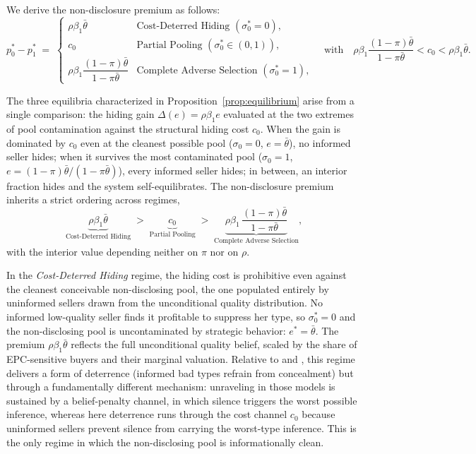 \documentclass[10pt,letterpaper]{bp-template-concise}
\begin{document}
We derive the non-disclosure premium as follows:
\begin{equation}
    p_0^*-p_1^* \;=\;
    \begin{cases}
        \rho\beta_1\bar{\theta}
            & \text{Cost-Deterred Hiding }(\sigma_0^*=0), \\[4pt]
        c_0
            & \text{Partial Pooling }(\sigma_0^*\in(0,1)), \\[4pt]
        \rho\beta_1\dfrac{(1-\pi)\bar{\theta}}{1-\pi\bar{\theta}}
            & \text{Complete Adverse Selection }(\sigma_0^*=1),
    \end{cases}
    \quad \text{with}\quad \rho\beta_1\frac{(1-\pi)\bar{\theta}}{1-\pi\bar{\theta}} < c_0 < \rho\beta_1\bar{\theta}.
    \label{eq:premium}
\end{equation}

The three equilibria characterized in Proposition~\ref{prop:equilibrium} arise from a single comparison: the hiding gain $\Delta(e)=\rho\beta_1 e$ evaluated at the two extremes of pool contamination against the structural hiding cost $c_0$. When the gain is dominated by $c_0$ even at the cleanest possible pool ($\sigma_0=0$, $e=\bar{\theta}$), no informed seller hides; when it survives the most contaminated pool ($\sigma_0=1$, $e=(1-\pi)\bar{\theta}/(1-\pi\bar{\theta})$), every informed seller hides; in between, an interior fraction hides and the system self-equilibrates. The non-disclosure premium inherits a strict ordering across regimes,
\begin{equation*}
    \underbrace{\rho\beta_1 \bar{\theta}}_{\text{Cost-Deterred Hiding}}
    \;>\;
    \underbrace{c_0}_{\text{Partial Pooling}}
    \;>\;
    \underbrace{\rho\beta_1\,\dfrac{(1-\pi)\bar{\theta}}{1-\pi\bar{\theta}}}_{\text{Complete Adverse Selection}},
\end{equation*}
with the interior value depending neither on $\pi$ nor on $\rho$.

In the \emph{Cost-Deterred Hiding} regime, the hiding cost is prohibitive even against the cleanest conceivable non-disclosing pool, the one populated entirely by uninformed sellers drawn from the unconditional quality distribution. No informed low-quality seller finds it profitable to suppress her type, so $\sigma_0^*=0$ and the non-disclosing pool is uncontaminated by strategic behavior: $e^*=\bar{\theta}$. The premium $\rho\beta_1\bar{\theta}$ reflects the full unconditional quality belief, scaled by the share of EPC-sensitive buyers and their marginal valuation. Relative to \citet{milgrom_good_1981} and \citet{grossman_informational_1981}, this regime delivers a form of deterrence (informed bad types refrain from concealment) but through a fundamentally different mechanism: unraveling in those models is sustained by a belief-penalty channel, in which silence triggers the worst possible inference, whereas here deterrence runs through the cost channel $c_0$ because uninformed sellers prevent silence from carrying the worst-type inference. This is the only regime in which the non-disclosing pool is informationally clean.
\end{document}
